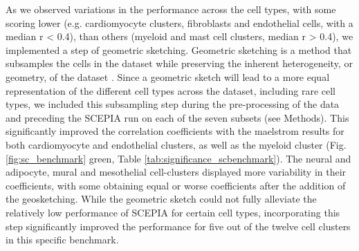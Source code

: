 As we observed variations in the performance across the cell types, with some scoring lower (e.g. cardiomyocyte clusters, fibroblasts and endothelial cells, with a median r < 0.4), than others (myeloid and mast cell clusters, median r > 0.4), we implemented a step of geometric sketching. Geometric sketching is a method that subsamples the cells in the dataset while preserving the inherent heterogeneity, or geometry, of the dataset \cite{Hie2019}. Since a geometric sketch will lead to a more equal representation of the different cell types across the dataset, including rare cell types, we included this subsampling step during the pre-processing of the data and preceding the SCEPIA run on each of the seven subsets (see Methods). This significantly improved the correlation coefficients with the maelstrom results for both cardiomyocyte and endothelial clusters, as well as the myeloid cluster (Fig. \ref{fig:sc_benchmark} green, Table \ref{tab:significance_scbenchmark}). The neural and adipocyte, mural and mesothelial cell-clusters displayed more variability in their coefficients, with some obtaining equal or worse coefficients after the addition of the geosketching. While the geometric sketch could not fully alleviate the relatively low performance of SCEPIA for certain cell types, incorporating this step significantly improved the performance for five out of the twelve cell clusters in this specific benchmark. 

